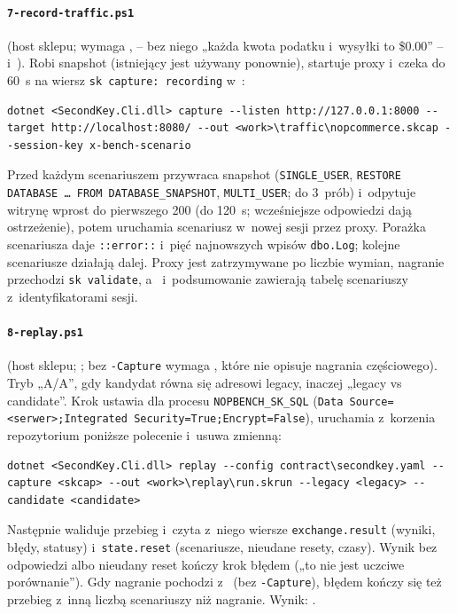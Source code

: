 \paragraph{\texttt{7-record-traffic.ps1}} (host sklepu; wymaga ,
 -- bez niego „każda kwota podatku i~wysyłki to \$0.00” --
i~). Robi snapshot (istniejący jest używany ponownie), startuje proxy i~czeka
do 60~s na wiersz \texttt{sk capture: recording} w~:

\begin{lstlisting}
dotnet <SecondKey.Cli.dll> capture --listen http://127.0.0.1:8000 --target http://localhost:8080/ --out <work>\traffic\nopcommerce.skcap --session-key x-bench-scenario
\end{lstlisting}

Przed każdym scenariuszem przywraca snapshot (\texttt{SINGLE\_USER}, \texttt{RESTORE
DATABASE … FROM DATABASE\_SNAPSHOT}, \texttt{MULTI\_USER}; do 3~prób) i~odpytuje witrynę
wprost do pierwszego 200 (do 120~s; wcześniejsze odpowiedzi dają ostrzeżenie), potem
uruchamia scenariusz w~nowej sesji przez proxy. Porażka scenariusza daje
\texttt{::error::} i~pięć najnowszych wpisów \texttt{dbo.Log}; kolejne scenariusze
działają dalej. Proxy jest zatrzymywane po liczbie wymian, nagranie przechodzi
\texttt{sk validate}, a~ i~podsumowanie zawierają tabelę scenariuszy
z~identyfikatorami sesji.

\paragraph{\texttt{8-replay.ps1}} (host sklepu; ; bez \texttt{-Capture}
wymaga , które nie opisuje nagrania częściowego). Tryb „A/A”, gdy
kandydat równa się adresowi legacy, inaczej „legacy vs candidate”. Krok ustawia dla
procesu  \texttt{NOPBENCH\_SK\_SQL} (\texttt{Data Source=<serwer>;Integrated
Security=True;Encrypt=False}), uruchamia z~korzenia repozytorium poniższe polecenie
i~usuwa zmienną:

\begin{lstlisting}
dotnet <SecondKey.Cli.dll> replay --config contract\secondkey.yaml --capture <skcap> --out <work>\replay\run.skrun --legacy <legacy> --candidate <candidate>
\end{lstlisting}

Następnie waliduje przebieg i~czyta z~niego wiersze \texttt{exchange.result} (wyniki,
błędy, statusy) i~\texttt{state.reset} (scenariusze, nieudane resety, czasy). Wynik bez
odpowiedzi albo nieudany reset kończy krok błędem („to nie jest uczciwe porównanie”). Gdy
nagranie pochodzi z~ (bez \texttt{-Capture}), błędem kończy się też
przebieg z~inną liczbą scenariuszy niż nagranie. Wynik: .

